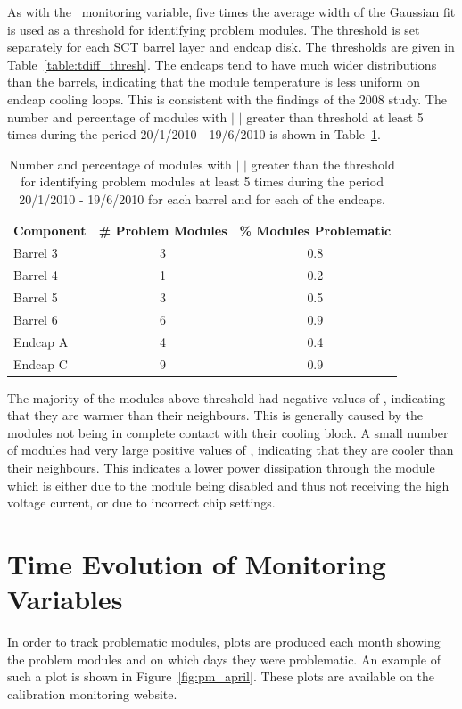 As with the \deltat\ monitoring variable, five times the average width of the
Gaussian fit is used as a threshold for identifying problem modules. The
threshold is set separately for each SCT barrel layer and endcap disk. The
thresholds are given in Table~\ref{table:tdiff_thresh}. The endcaps tend to have
much wider distributions than the barrels, indicating that the module
temperature is less uniform on endcap cooling loops. This is consistent with the
findings of the 2008 study. The number and percentage of modules with $|$
\tdiff$|$ greater than threshold at least 5 times during the period 20/1/2010 -
19/6/2010 is shown in Table~\ref{table:tdiff_num}.

\begin{table}
 \centering
\begin{tabular}{  l  c  c }
\hline\hline
Component & \# Problem Modules & \% Modules Problematic \\
\hline
Barrel 3 & 3 & 0.8 \\
Barrel 4 & 1 & 0.2 \\
Barrel 5 & 3 & 0.5 \\
Barrel 6 & 6 & 0.9 \\
Endcap A & 4 & 0.4 \\
Endcap C & 9 & 0.9 \\
\hline\hline
 \end{tabular}
\caption{Number and percentage of modules with $|$ \tdiff$|$ greater than the
threshold for identifying problem modules at least 5 times during the period
20/1/2010 - 19/6/2010 for each barrel and for each of the endcaps.}
\label{table:tdiff_num}
\end{table}

The majority of the modules above threshold had negative values of \tdiff,
indicating that they are warmer than their neighbours. This is generally caused
by the modules not being in complete contact with their cooling block. A small
number of modules had very large positive values of \tdiff, indicating that they
are cooler than their neighbours. This indicates a lower power dissipation
through the module which is either due to the module being disabled and thus not
receiving the high voltage current, or due to incorrect chip settings.

\section{Time Evolution of Monitoring Variables}

In order to track problematic modules, plots are produced each month showing the
problem modules and on which days they were problematic. An example of such a
plot is shown in Figure~\ref{fig:pm_april}. These plots are available on the
calibration monitoring website.

